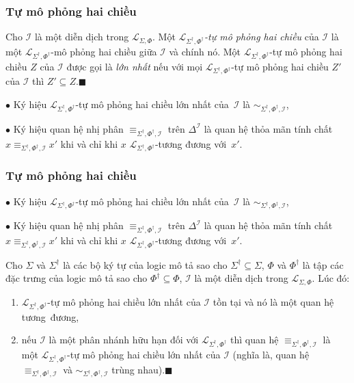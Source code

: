 \documentclass[fleqn]{beamer}
\newcommand{\mL}		{\mathcal{L}}
\newcommand{\mI}		{\mathcal{I}}
\newcommand{\SigmaDag}	{\Sigma^\dag}
\newcommand{\mLSP}		{\mL_{\Sigma,\Phi}}
\newcommand{\mLSPD}		{\mL_{\Sigma^\dag,\Phi^\dag}}
\newcommand{\SdPdI}		{{\SigmaDag,\Phi^\dag,\mI}}
\newcommand{\myend}		{\mbox{}\hfill\mbox{{\tiny$\!\blacksquare$}}}
\begin{document}
\begin{frame}\frametitle{\textbf{Tự mô phỏng hai chiều}}
	\begin{definition}
		Cho $\mI$ là một diễn dịch trong $\mLSP$. Một {\em $\mLSPD$-tự mô phỏng hai chiều} của $\mI$ là một $\mLSPD$-mô phỏng hai chiều giữa $\mI$ và chính nó. Một $\mLSPD$-tự mô phỏng hai chiều $Z$ của $\mI$ được gọi là {\em lớn nhất} nếu với mọi $\mLSPD$-tự mô phỏng hai chiều $Z'$ của $\mI$ thì $Z' \subseteq Z$.\myend
	\end{definition}
	\vspace{1.0ex}
	
	$\bullet$ Ký hiệu $\mLSPD$-tự mô phỏng hai chiều lớn nhất của~$\mI$ là $\sim_\SdPdI$, 
	\vspace{2.0ex}
	
	$\bullet$ Ký hiệu quan hệ nhị phân $\equiv_\SdPdI$ trên $\Delta^\mI$ là quan hệ thỏa mãn tính chất $x \equiv_\SdPdI x'$ khi và chỉ khi $x$ $\mLSPD$-tương đương với~$x'$.
\end{frame}
\begin{frame}\frametitle{\textbf{Tự mô phỏng hai chiều}}
	$\bullet$ Ký hiệu $\mLSPD$-tự mô phỏng hai chiều lớn nhất của~$\mI$ là $\sim_\SdPdI$, 
	\vspace{2.0ex}
	
	$\bullet$ Ký hiệu quan hệ nhị phân $\equiv_\SdPdI$ trên $\Delta^\mI$ là quan hệ thỏa mãn tính chất $x \equiv_\SdPdI x'$ khi và chỉ khi $x$ $\mLSPD$-tương đương với~$x'$.
	
	\begin{theorem}
		Cho $\Sigma$ và $\SigmaDag$ là các bộ ký tự của logic mô tả sao cho $\SigmaDag \subseteq \Sigma$, $\Phi$ và $\Phi^\dag$ là tập các đặc trưng của logic mô tả sao cho $\Phi^\dag \subseteq \Phi$, $\mI$ là một diễn dịch trong $\mLSP$. Lúc đó:
		\begin{enumerate}
			\item $\mLSPD$-tự mô phỏng hai chiều lớn nhất của $\mI$ tồn tại và nó là một quan hệ tương~đương,\label{th:SDFHG-item1}
			
			\item nếu $\mI$ là một phân nhánh hữu hạn đối với $\mLSPD$ thì quan hệ $\equiv_\SdPdI$ là một $\mLSPD$-tự mô phỏng hai chiều lớn nhất của $\mI$ (nghĩa là, quan hệ $\equiv_\SdPdI$ và $\sim_\SdPdI$ trùng nhau).\label{th:SDFHG-item2}\myend
		\end{enumerate}
	\end{theorem}
\end{frame}
\end{document}
